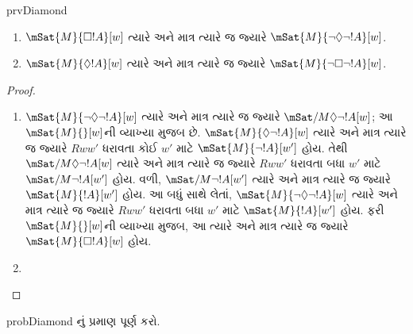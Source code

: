 \documentclass[../../../include/open-logic-section]{subfiles}
\begin{document}
\begin{tagblock}{prvDiamond}
\begin{prop}
  \begin{enumerate}
  \item $\mSat{M}{\Box !A}[w]$ ત્યારે અને માત્ર ત્યારે જ જ્યારે $\mSat{M}{\lnot\Diamond\lnot !A}[w]$.
  \item $\mSat{M}{\Diamond !A}[w]$ ત્યારે અને માત્ર ત્યારે જ જ્યારે $\mSat{M}{\lnot\Box\lnot !A}[w]$.
  \end{enumerate}
\end{prop}

\begin{proof}
  \begin{enumerate}
    \item $\mSat{M}{\lnot\Diamond\lnot !A}[w]$ ત્યારે અને માત્ર ત્યારે જ જ્યારે $\mSat/{M}{\Diamond\lnot
      !A}[w]$; આ $\mSat{M}{}[w]$ની વ્યાખ્યા મુજબ છે. $\mSat{M}{\Diamond\lnot
      !A}[w]$ ત્યારે અને માત્ર ત્યારે જ જ્યારે $Rww'$ ધરાવતા કોઈ $w'$ માટે
      $\mSat{M}{\lnot !A}[w']$ હોય. તેથી $\mSat/{M}{\Diamond\lnot !A}[w]$
      ત્યારે અને માત્ર ત્યારે જ જ્યારે $Rww'$ ધરાવતા બધા $w'$ માટે
      $\mSat/{M}{\lnot !A}[w']$ હોય. વળી, $\mSat/{M}{\lnot !A}[w']$
      ત્યારે અને માત્ર ત્યારે જ જ્યારે $\mSat{M}{!A}[w']$ હોય. આ બધું
      સાથે લેતાં, $\mSat{M}{\lnot\Diamond\lnot !A}[w]$ ત્યારે અને માત્ર
      ત્યારે જ જ્યારે $Rww'$ ધરાવતા બધા $w'$ માટે $\mSat{M}{!A}[w']$ હોય.
      ફરી $\mSat{M}{}[w]$ની વ્યાખ્યા મુજબ, આ ત્યારે અને માત્ર ત્યારે જ
      જ્યારે $\mSat{M}{\Box !A}[w]$ હોય.
    \item {}
  \end{enumerate}
\end{proof}

\begin{probtag}{probDiamond}
  નું પ્રમાણ પૂર્ણ કરો.
\end{probtag}
\end{tagblock}
\end{document}
